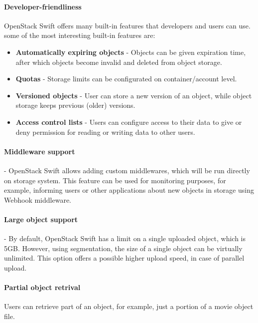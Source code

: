     \paragraph{Developer-friendliness}
    OpenStack Swift offers many built-in features that developers and users can use. some of the most interesting built-in features are\cite{swiftOpenStackSwift}:
    \begin{itemize}
        \item \textbf{Automatically expiring objects} - Objects can be given expiration time, after which objects become invalid and deleted from object storage.
        \item \textbf{Quotas} - Storage limits can be configurated on container/account level.
        \item \textbf{Versioned objects} - User can store a new version of an object, while object storage keeps previous (older) versions.
        \item \textbf{Access control lists} - Users can configure access to their data to give or deny permission for reading or writing data to other users.
    \end{itemize}

    \paragraph{Middleware support}
    - OpenStack Swift allows adding custom middlewares, which will be run directly on storage system\cite{swiftEssentials}. This feature can be used for monitoring purposes, for example, informing users or other applications about new objects in storage using Webhook middleware.

    \paragraph{Large object support}
    - By default, OpenStack Swift has a limit on a single uploaded object, which is 5GB. However, using segmentation, the size of a single object can be virtually unlimited. This option offers a possible higher upload speed, in case of parallel upload\cite{swiftLOS}.

    \paragraph{Partial object retrival}
    Users can retrieve part of an object, for example, just a portion of a movie object file\cite{swiftImplementingCloudStorage}.

